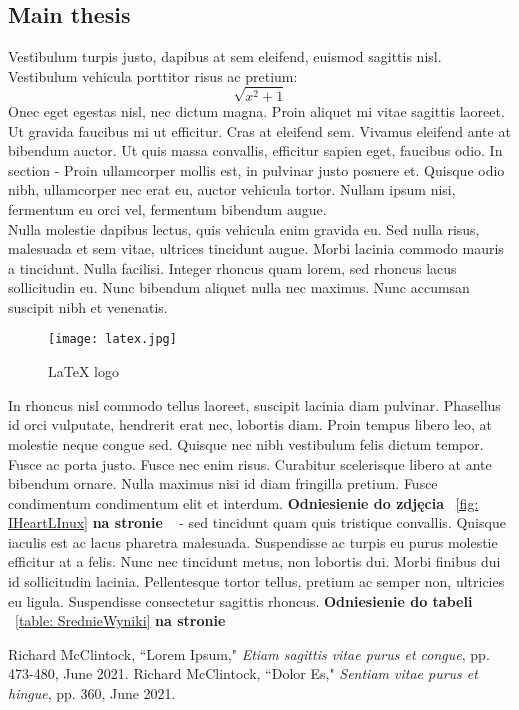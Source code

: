 \documentclass[12pt,a4paper]{article}
\begin{document}
	
	\subsection{Main thesis}
	Vestibulum turpis justo, dapibus at sem eleifend, euismod sagittis nisl. Vestibulum vehicula porttitor risus ac pretium:
	\[\sqrt{x^2+1}\] 
	Onec eget egestas nisl, nec dictum magna. Proin aliquet mi vitae sagittis laoreet. Ut gravida faucibus mi ut efficitur. Cras at eleifend sem. Vivamus eleifend ante at bibendum auctor. Ut quis massa convallis, efficitur sapien eget, faucibus odio.
	In section  - Proin ullamcorper mollis est, in pulvinar justo posuere et. Quisque odio nibh, ullamcorper nec erat eu, auctor vehicula tortor. Nullam ipsum nisi, fermentum eu orci vel, fermentum bibendum augue.
	\\Nulla molestie dapibus lectus, quis vehicula enim gravida eu. Sed nulla risus, malesuada et sem vitae, ultrices tincidunt augue. Morbi lacinia commodo mauris a tincidunt. Nulla facilisi. Integer rhoncus quam lorem, sed rhoncus lacus sollicitudin eu. Nunc bibendum aliquet nulla nec maximus. Nunc accumsan suscipit nibh et venenatis. 
	\begin{figure}[H]
		\centering
		\texttt{[image: latex.jpg]}
		\caption{LaTeX logo}
		\label{fig: LaTeXlogo}
	\end{figure}

	In rhoncus nisl commodo tellus laoreet, suscipit lacinia diam pulvinar. Phasellus id orci vulputate, hendrerit erat nec, lobortis diam. Proin tempus libero leo, at molestie neque congue sed. Quisque nec nibh vestibulum felis dictum tempor. Fusce ac porta justo. Fusce nec enim risus. Curabitur scelerisque libero at ante bibendum ornare. Nulla maximus nisi id diam fringilla pretium. Fusce condimentum condimentum elit et interdum. \textbf{Odniesienie do zdjęcia} ~\ref{fig: IHeartLInux} \textbf{na stronie} ~\pageref{fig: IHeartLInux} - sed tincidunt quam quis tristique convallis.
	Quisque iaculis est ac lacus pharetra malesuada. Suspendisse ac turpis eu purus molestie efficitur at a felis. Nunc nec tincidunt metus, non lobortis dui. Morbi finibus dui id sollicitudin lacinia. Pellentesque tortor tellus, pretium ac semper non, ultricies eu ligula. Suspendisse consectetur sagittis rhoncus. \textbf{Odniesienie do tabeli} ~\ref{table: SrednieWyniki} \textbf{na stronie} ~\pageref{table: SrednieWyniki}
	
	\newpage
	\begin{thebibliography}{10}
		Richard McClintock, ``Lorem Ipsum," \emph{Etiam sagittis vitae purus et congue}, pp. 473-480, June 2021.
		Richard McClintock, ``Dolor Es," \emph{Sentiam vitae purus et hingue}, pp. 360, June 2021.
	\end{thebibliography}
	
\end{document}
